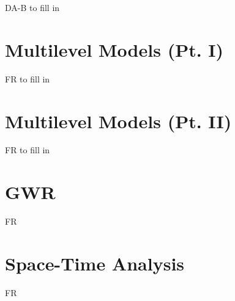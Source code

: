\documentclass[]{book}
\begin{document}
DA-B to fill in

\hypertarget{multilevel-models-pt.-i}{%
\chapter{Multilevel Models (Pt. I)}\label{multilevel-models-pt.-i}}

FR to fill in

\hypertarget{multilevel-models-pt.-ii}{%
\chapter{Multilevel Models (Pt. II)}\label{multilevel-models-pt.-ii}}

FR to fill in

\hypertarget{gwr}{%
\chapter{GWR}\label{gwr}}

FR

\hypertarget{space-time-analysis}{%
\chapter{Space-Time Analysis}\label{space-time-analysis}}

FR


\end{document}
